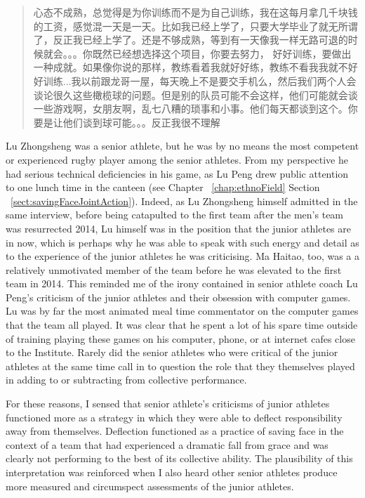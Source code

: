 \begin{CJK}{UTF8}{gbsn}
  \begin{quote}
    心态不成熟，总觉得是为你训练而不是为自己训练，我在这每月拿几千块钱的工资，感觉混一天是一天。比如我已经上学了，只要大学毕业了就无所谓了，反正我已经上学了。还是不够成熟，等到有一天像我一样无路可退的时候就会。。。你既然已经想选择这个项目，你要去努力， 好好训练，要做出一种成就。如果像你说的那样，教练看着我就好好练，教练不看我我就不好好训练...我以前跟龙哥一屋，每天晚上不是要交手机么，然后我们两个人会谈论很久这些橄榄球的问题。但是别的队员可能不会这样，他们可能就会谈一些游戏啊，女朋友啊，乱七八糟的琐事和小事。他们每天都谈到这个。你要是让他们谈到球可能。。。反正我很不理解
  \end{quote}


Lu Zhongsheng was a senior athlete, but he was by no means the most competent or experienced rugby player among the senior athletes.  From my perspective he had serious technical deficiencies in his game, as Lu Peng drew public attention to one lunch time in the canteen (see Chapter ~\ref{chap:ethnoField} Section ~\ref{sect:savingFaceJointAction}).  Indeed, as Lu Zhongsheng himself admitted in the same interview, before being catapulted to the first team after the men's team was resurrected 2014, Lu himself was in the position that the junior athletes are in now, which is perhaps why he was able to speak with such energy and detail as to the experience of the junior athletes he was criticising.  Ma Haitao, too, was a a relatively unmotivated member of the team before he was elevated to the first team in 2014.  This reminded me of the irony contained in senior athlete coach Lu Peng's criticism of the junior athletes and their obsession with computer games.  Lu was by far the most animated meal time commentator on the computer games that the team all played. It was clear that he spent a lot of his spare time outside of training playing these games on his computer, phone, or at internet cafes close to the Institute.  Rarely did the senior athletes who were critical of the junior athletes at the same time call in to question the role that they themselves played in adding to or subtracting from collective performance.

For these reasons, I sensed that senior athlete's criticisms of junior athletes functioned more as a strategy in which they were able to deflect responsibility away from themselves.  Deflection functioned as a practice of saving face in the context of a team that had experienced a dramatic fall from grace and was clearly not performing to the best of its collective ability.  The plausibility of this interpretation was reinforced when I also heard other senior athletes produce more measured and circumspect assessments of the junior athletes.


\end{CJK}
